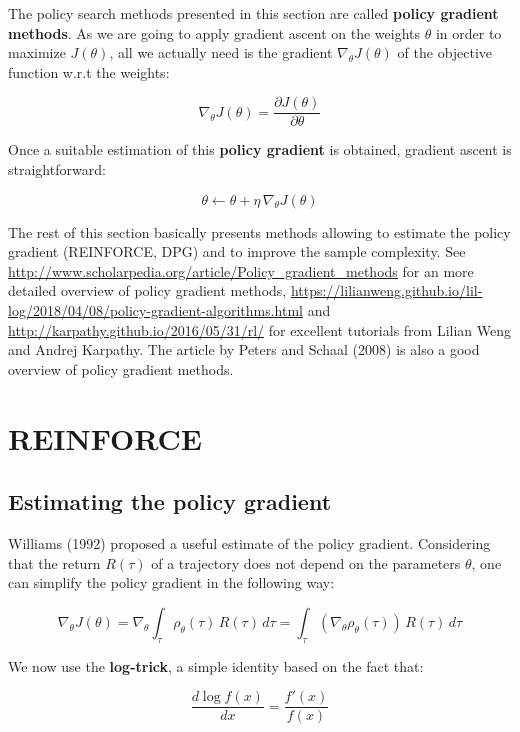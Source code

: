 \documentclass[
  letterpaper,
  DIV=11,
  numbers=noendperiod]{scrreprt}
\begin{document}
The policy search methods presented in this section are called
\textbf{policy gradient methods}. As we are going to apply gradient
ascent on the weights \(\theta\) in order to maximize \(J(\theta)\), all
we actually need is the gradient \(\nabla_\theta J(\theta)\) of the
objective function w.r.t the weights:

\[
    \nabla_\theta J(\theta) = \frac{\partial J(\theta)}{\partial \theta}
\]

Once a suitable estimation of this \textbf{policy gradient} is obtained,
gradient ascent is straightforward:

\[
    \theta \leftarrow \theta + \eta \, \nabla_\theta J(\theta)
\]

The rest of this section basically presents methods allowing to estimate
the policy gradient (REINFORCE, DPG) and to improve the sample
complexity. See
\url{http://www.scholarpedia.org/article/Policy_gradient_methods} for an
more detailed overview of policy gradient methods,
\url{https://lilianweng.github.io/lil-log/2018/04/08/policy-gradient-algorithms.html}
and \url{http://karpathy.github.io/2016/05/31/rl/} for excellent
tutorials from Lilian Weng and Andrej Karpathy. The article by Peters
and Schaal (2008) is also a good overview of policy gradient methods.

\hypertarget{reinforce}{%
\section{REINFORCE}\label{reinforce}}

\hypertarget{estimating-the-policy-gradient}{%
\subsection{Estimating the policy
gradient}\label{estimating-the-policy-gradient}}

Williams (1992) proposed a useful estimate of the policy gradient.
Considering that the return \(R(\tau)\) of a trajectory does not depend
on the parameters \(\theta\), one can simplify the policy gradient in
the following way:

\[
    \nabla_\theta J(\theta) = \nabla_\theta \int_\tau \rho_\theta (\tau) \, R(\tau) \, d\tau =  \int_\tau (\nabla_\theta \rho_\theta (\tau)) \, R(\tau) \, d\tau
\]

We now use the \textbf{log-trick}, a simple identity based on the fact
that:

\[
    \frac{d \log f(x)}{dx} = \frac{f'(x)}{f(x)}
\]
\end{document}
